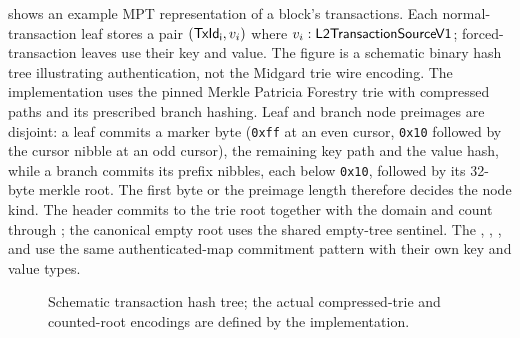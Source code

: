 \documentclass[../midgard.tex]{subfiles}
\begin{document}
 shows an example MPT representation of a block's transactions.
Each normal-transaction leaf stores a pair $(\mathsf{TxId_i}, v_i)$ where
$v_i : \mathsf{L2TransactionSourceV1}$; forced-transaction leaves use their
 key and  value.
The figure is a schematic binary hash tree illustrating authentication, not the Midgard trie wire encoding.
The implementation uses the pinned Merkle Patricia Forestry trie with compressed paths and its prescribed branch hashing.
Leaf and branch node preimages are disjoint: a leaf commits a marker byte (\texttt{0xff} at an even cursor, \texttt{0x10} followed by the cursor nibble at an odd cursor), the remaining key path and the value hash, while a branch commits its prefix nibbles, each below \texttt{0x10}, followed by its 32-byte merkle root.
The first byte or the preimage length therefore decides the node kind.
The header commits to the trie root together with the domain and count through ; the canonical empty root uses the shared empty-tree sentinel.
The , , , and  use the same authenticated-map commitment pattern with their own key and value types.

\begin{figure}[htb]
\centering
{}
\caption[Transaction authentication schematic]{Schematic transaction hash tree; the actual compressed-trie and counted-root encodings are defined by the implementation.}
\label{fig:block-tx-mpt}
\end{figure}
\end{document}
